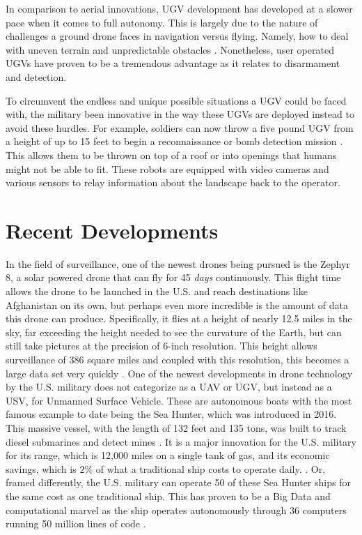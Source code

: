 \documentclass[sigconf]{acmart}
\begin{document}
In comparison to aerial innovations, UGV development has developed at a slower pace when it comes to full autonomy. This is largely due to the nature of challenges a ground drone faces in navigation versus flying. Namely, how to deal with uneven terrain and unpredictable obstacles \cite{nytugv}. Nonetheless, user operated UGVs have proven to be a tremendous advantage as it relates to disarmament and detection.

To circumvent the endless and unique possible situations a UGV could be faced with, the military been innovative in the way these UGVs are deployed instead to avoid these hurdles. For example, soldiers can now throw a five pound UGV from a height of up to 15 feet to begin a reconnaissance or bomb detection mission \cite{throwugv}. This allows them to be thrown on top of a roof or into openings that humans might not be able to fit. These robots are equipped with video cameras and various sensors to relay information about the landscape back to the operator.  

\section{Recent Developments}
In the field of surveillance, one of the newest drones being pursued is the Zephyr 8, a solar powered drone that can fly for 45 \emph{days} continuously. This flight time allows the drone to be launched in the U.S. and reach destinations like Afghanistan on its own, but perhaps even more incredible is the amount of data this drone can produce. Specifically, it flies at a height of nearly 12.5 miles in the sky, far exceeding the height needed to see the curvature of the Earth, but can still take pictures at the precision of 6-inch resolution. This height allows surveillance of 386 square miles and coupled with this resolution, this becomes a large data set very quickly \cite{foxdrone}. 
One of the newest developments in drone technology by the U.S. military does not categorize as a UAV or UGV, but instead as a USV, for Unmanned Surface Vehicle. These are autonomous boats with the most famous example to date being the Sea Hunter, which was introduced in 2016. This massive vessel, with the length of 132 feet and 135 tons, was built to track diesel submarines and detect mines \cite{seahunter}. It is a major innovation for the U.S. military for its range, which is 12,000 miles on a single tank of gas, and its economic savings, which is $2\%$ of what a traditional ship costs to operate daily. \cite{seahuntergas} \cite{seahuntercost}. Or, framed differently, the U.S. military can operate 50 of these Sea Hunter ships for the same cost as one traditional ship. This has proven to be a Big Data and computational marvel as the ship operates autonomously through 36 computers running 50 million lines of code \cite{60minutes}.
\end{document}
